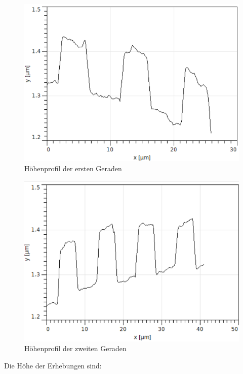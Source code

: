 \begin{figure}[h]
    \centering
    \includegraphics[scale = 0.65]{Bilder/zReihe1.png}
    \caption{Höhenprofil der ersten Geraden}
    \label{bild:zReihe1}
\end{figure}

\begin{figure}[h]
    \centering
    \includegraphics[scale = 0.65]{Bilder/zReihe2.png}
    \caption{Höhenprofil der zweiten Geraden}
    \label{bild:zReihe2}
\end{figure}

\clearpage

Die Höhe der Erhebungen sind: 

